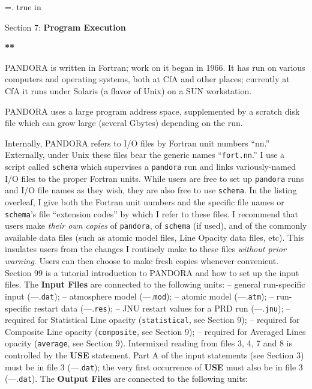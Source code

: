%
\newtoks\footline \footline={\hss{}.\folio\hss}
\top
{} true in
\centerline{Section 7: {\bf Program Execution}}
\blankline
\blankline
\centerline{\bf ***}
\blankline
\blankline
PANDORA is written in Fortran; work on it began in 1966. It has run on
various computers and operating systems, both at CfA and other places;
currently at CfA it runs under Solaris (a flavor of Unix) on a SUN workstation.

PANDORA uses a large program address space, supplemented by a scratch
disk file which can grow large (several Gbytes) depending on the run.

Internally, PANDORA refers to I/O files by Fortran unit numbers ``nn.''
Externally, under Unix these files bear the generic names ``{\tt fort.nn}.''
I use a script called {\tt schema} which supervises a {\tt pandora} run and links
variously-named I/O files to the proper Fortran units. While users
are free to set up {\tt pandora} runs and I/O file names as they wish, they are
also free to use {\tt schema}. In the listing overleaf, I give both the Fortran
unit numbers and the specific file names or {\tt schema}'s file ``extension codes''
by which I refer to these files.
\blankline
I recommend that users make {\it their own copies} of {\tt pandora},
of {\tt schema} (if used), and of the commonly available data files
(such as atomic model files, Line Opacity data files, etc). This insulates
users from the changes I routinely make to these files {\it without prior
warning}. Users can then choose to make fresh copies whenever convenient.
\blankline
Section 99 is a tutorial introduction to PANDORA and how to set
up the input files.
\ej
The {\bf Input Files} are connected to the following units:
\spice
{} -- general run-specific input (---.{\tt dat});
 -- atmosphere model (---.{\tt mod});
 -- atomic model (---.{\tt atm});
 -- run-specific restart data (---.{\tt res});
 -- JNU restart values for a PRD run (---.{\tt jnu});
 -- required for Statistical Line opacity ({\tt statistical}, see Section 9);
 -- required for Composite Line opacity ({\tt composite}, see Section 9);
 -- required for Averaged Lines opacity ({\tt average}, see Section 9).
\spice
Intermixed reading from files 3, 4, 7 and 8 is controlled by the {\bf USE} statement.
Part A of the input statements (see Section 3) must be in file 3 (---.{\tt dat});
the very first occurrence of {\bf USE} must also be in file 3 (---.{\tt dat}).
\blankline
The {\bf Output Files} are connected to the following units:
